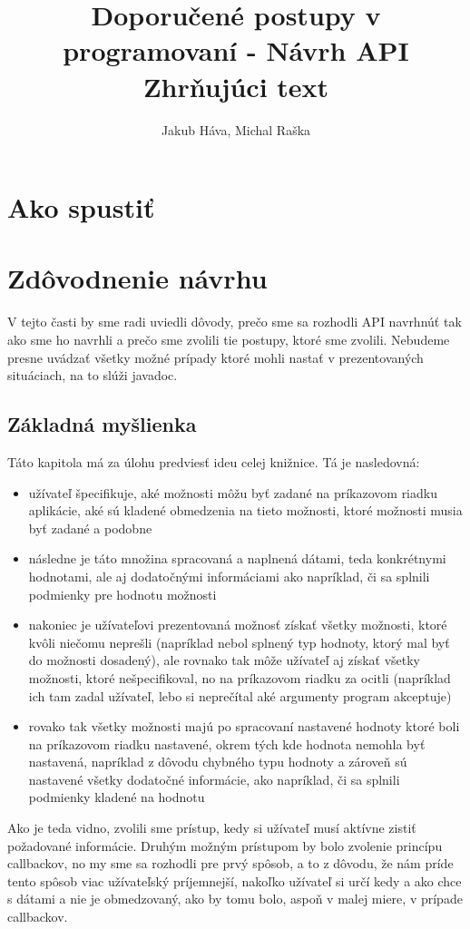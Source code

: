 \documentclass{article}
\title{\vspace{30mm}Doporučené postupy v programovaní - Návrh API\\Zhrňujúci text}
\author{Jakub Háva, Michal Raška}
\date{}
\begin{document}
\maketitle
\thispagestyle{empty}

\clearpage
\tableofcontents

\clearpage
\section{Ako spustiť}

\section{Zdôvodnenie návrhu}
V tejto časti by sme radi uviedli dôvody, prečo sme sa rozhodli API navrhnúť tak ako sme ho navrhli a prečo sme zvolili tie postupy, ktoré sme zvolili. Nebudeme presne uvádzať všetky možné prípady ktoré mohli nastať v prezentovaných situáciach, na to slúži javadoc.
\subsection{Základná myšlienka}
Táto kapitola má za úlohu predviesť ideu celej knižnice. Tá je nasledovná:
\begin{itemize}
	\item užívateľ špecifikuje, aké možnosti môžu byť zadané na príkazovom riadku aplikácie, aké sú kladené obmedzenia na tieto možnosti, ktoré možnosti musia byť zadané a podobne
	\item následne je táto množina spracovaná a naplnená dátami, teda konkrétnymi hodnotami, ale aj dodatočnými informáciami ako napríklad, či sa splnili podmienky pre hodnotu možnosti
	\item nakoniec je užívateľovi prezentovaná možnosť získať všetky možnosti, ktoré kvôli niečomu neprešli (napríklad nebol splnený typ hodnoty, ktorý mal byť do možnosti dosadený), ale rovnako tak môže užívateľ aj získať všetky možnosti, ktoré nešpecifikoval, no na príkazovom riadku za ocitli (napríklad ich tam zadal užívateľ, lebo si neprečítal aké argumenty program akceptuje)
	\item rovako tak všetky možnosti majú po spracovaní nastavené hodnoty ktoré boli na príkazovom riadku nastavené, okrem tých kde hodnota nemohla byť nastavená, napríklad z dôvodu chybného typu hodnoty a zároveň sú nastavené všetky dodatočné informácie, ako napríklad, či sa splnili podmienky kladené na hodnotu
\end{itemize}
Ako je teda vidno, zvolili sme prístup, kedy si užívateľ musí aktívne zistiť požadované informácie. Druhým možným prístupom by bolo zvolenie princípu callbackov, no my sme sa rozhodli pre prvý spôsob, a to z dôvodu, že nám príde tento spôsob viac užívateľský príjemnejší, nakoľko užívateľ si určí kedy a ako chce s dátami a nie je obmedzovaný, ako by tomu bolo, aspoň v malej miere, v prípade callbackov.
\end{document}
